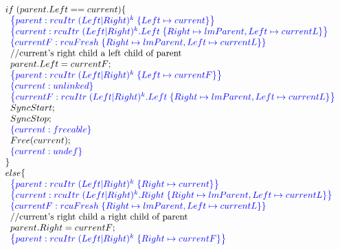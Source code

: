 \[\begin{array}{@{}l@{}}
         \;\;\;\;\;\;if\; (parent.Left == current)\{\\
                \;\;\;\;\;\;\;\;\specline{parent:rcuItr\; (Left|Right)^{k} \; \{ Left\mapsto current\} }\\
                \;\;\;\;\;\;\;\;\specline{current:rcuItr\; (Left|Right)^{k}.Left \; \{Right\mapsto lmParent, Left \mapsto currentL \} }\\
                \;\;\;\;\;\;\;\;\specline{currentF:rcuFresh \; \{Right\mapsto lmParent, Left\mapsto currentL\}}\\
                \;\;\;\;\;\;\;\;\text{//current's right child a left child of parent}\\
                \;\;\;\;\;\;\;\;parent.Left = currentF; \\
                \;\;\;\;\;\;\;\;\specline{parent:rcuItr\; (Left|Right)^{k} \; \{ Left\mapsto currentF\} }\\
                \;\;\;\;\;\;\;\;\specline{current:unlinked }\\
                \;\;\;\;\;\;\;\;\specline{currentF:rcuItr \; (Left|Right)^{k}.Left \; \{Right\mapsto lmParent, Left\mapsto currentL\}}\\
                \;\;\;\;\;\;\;\;SyncStart;\\
                \;\;\;\;\;\;\;\;SyncStop;\\
                \;\;\;\;\;\;\;\;\specline{current:freeable}\\
                \;\;\;\;\;\;\;\;Free(current);\\
                \;\;\;\;\;\;\;\;\specline{current:undef}\\
            \;\;\;\;\;\;\} \\
            \;\;\;\;\;\;else\{ \\
                \;\;\;\;\;\;\;\;\specline{parent:rcuItr\; (Left|Right)^{k} \; \{ Right\mapsto current\}}\\
                \;\;\;\;\;\;\;\;\specline{current:rcuItr\; (Left|Right)^{k}.Right \; \{Right\mapsto lmParent, Left \mapsto currentL \}}\\
                \;\;\;\;\;\;\;\;\specline{currentF:rcuFresh \; \{Right\mapsto lmParent, Left\mapsto currentL\}}\\
                \;\;\;\;\;\;\;\;\text{//current's right child a right child of parent}\\
                \;\;\;\;\;\;\;\;parent.Right = currentF; \\
                \;\;\;\;\;\;\;\;\specline{parent:rcuItr\; (Left|Right)^{k} \; \{ Right\mapsto currentF\} }\\

\end{array}\]
